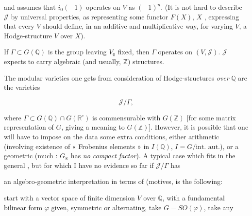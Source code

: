 \documentclass[11pt,a4paper]{article}
\begin{document}


and assumes that $i_{0}(-1)$ operates on $V$ as  $(-1)^{n}$. (It
is not hard to describe $\mathcal{J}$ by universal properties, as
\struck{\ill{}} representing some functor $F(X)$, $X$ ,
expressing that every $V$  should \struck{\ill{}} define, in an
additive and multiplicative way, for varying $V$, a Hodge-structure $V$ over
$X$).


If $\Gamma \subset G(\mathbb{Q})$ is the group leaving $V_{0}$ fixed, then
$\Gamma$ operates on $(V, \mathcal{J})$. $\mathcal{J}$ expects to carry
algebraic (and usually, $\mathbb{Z}$) structures.

The modular varieties one gets from consideration of Hodge-structures
\emph{over} $\mathbb{Q}$ are the varieties

\[ \mathcal{J} / \Gamma , \]

where $\Gamma \subset G(\mathbb{Q}) \cap G(\mathbb{R}^{\circ})$ is
commensurable with $G(\mathbb{Z})$ [for some \struck{\ill{}} matrix
representation of $G$, \struck{\ill{}} giving a meaning to $G(\mathbb{Z})$].
However, it is possible that one will have to impose on the data some extra
conditions, either arithmetic (involving existence of « Frobenius elements » in
\struck{\ill{}} $I(\mathbb{Q})$, $I = G/\text{int.\ aut.}$), or a geometric
 (much \ill{} : $G_{\mathbb{R}}$ has \emph{no compact
factor}). A typical case which fits in the general 
, but for which I have no evidence so far if $\mathcal{J}/
\Gamma$ has


an algebro-geometric interpretation in terms of  (motives, is the
following:

start with a vector space of finite dimension $V$ over $\mathbb{Q}$, with
\struck{\ill{}} a fundamental bilinear form $\varphi$ given, symmetric or
alternating, take $G = SO(\varphi)$, take any
\end{document}
